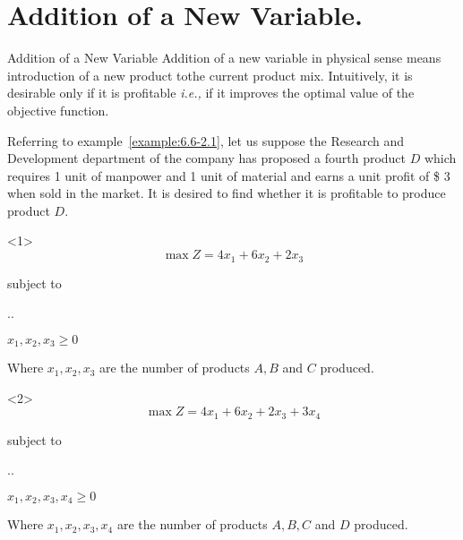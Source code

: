 
\section{Addition of a New Variable.}
\label{sec:addition-new-variable}


\begin{frame}{Addition of a New Variable}{}
  Addition of a new variable in physical sense means introduction of a new product tothe current product mix. Intuitively, it is desirable only if it is profitable \emph{i.e.,} if it improves the optimal value of the objective function.


\end{frame}

  \begin{frameExample}{}{}
    Referring to example~\ref{example:6.6-2.1}, let us suppose the Research and Development department of the company has proposed a fourth product $D$ which requires 1 unit of manpower and 1 unit of material and earns a unit profit of \$ 3 when sold in the market. It is desired to find whether it is profitable to produce product $D$.

    \begin{onlyenv}<1>
            \[\max Z = 4x_1 +6x_2 +2x_3 \]

  {\centering
    subject to

    \vspace{3mm}
    \sysdelim..%

  $x_1, x_2, x_3 \geq 0$
  \par}

  Where   $x_1, x_2, x_3$ are the number of products $A, B $ and $C$ produced.
\end{onlyenv}

\begin{onlyenv}<2>
        \[\max Z = 4x_1 +6x_2 +2x_3 + 3x_4 \]

  {\centering
    subject to

    \vspace{3mm}
    \sysdelim..%

  $x_1, x_2, x_3, x_4 \geq 0$
  \par}

  Where   $x_1, x_2, x_3, x_4$ are the number of products $A, B, C $ and $D$ produced.
\end{onlyenv}
  \end{frameExample}

